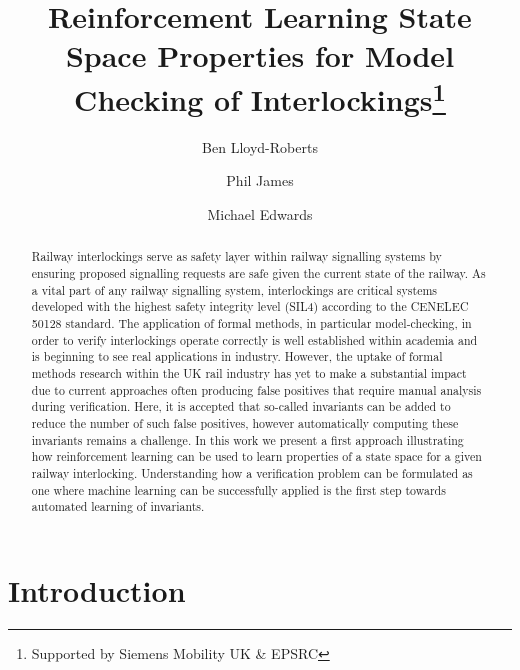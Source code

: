 \documentclass[runningheads]{llncs}
\begin{document}
%
\title{Reinforcement Learning  State Space Properties for Model Checking of Interlockings\thanks{Supported by Siemens Mobility UK \& EPSRC}}
%
%
\author{Ben Lloyd-Roberts \and
Phil James \and
Michael Edwards}
%
%


%
\maketitle              %
%
\begin{abstract}
Railway interlockings serve as safety layer within railway signalling systems by ensuring proposed signalling requests are safe given the current state of the railway. As a vital part of any railway signalling system, interlockings are critical systems developed with the highest safety integrity level (SIL4) according to the CENELEC 50128 standard. The application of formal methods, in particular model-checking, in order to verify interlockings operate correctly is well established within academia and is beginning to see real applications in industry. However, the uptake of formal methods research within the UK rail industry has yet to make a substantial impact due to current approaches often producing false positives that require manual analysis during verification. Here, it is accepted that so-called invariants can be added to reduce the number of such false positives, however automatically computing these invariants remains a challenge. In this work we present a first approach illustrating how reinforcement learning can be used to learn properties of a state space for a given railway interlocking. Understanding how a verification problem can be formulated as one where machine learning can be successfully applied is the first step towards automated learning of invariants.

\end{abstract}


\section{Introduction}
\end{document}
